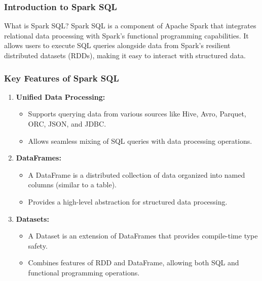 \documentclass[aspectratio=169]{beamer}
\begin{document}
\begin{frame}[fragile]
    \frametitle{Introduction to Spark SQL}
    \begin{block}{What is Spark SQL?}
        Spark SQL is a component of Apache Spark that integrates relational data processing with Spark's functional programming capabilities. It allows users to execute SQL queries alongside data from Spark’s resilient distributed datasets (RDDs), making it easy to interact with structured data.
    \end{block}
\end{frame}

\begin{frame}[fragile]
    \frametitle{Key Features of Spark SQL}
    \begin{enumerate}
        \item \textbf{Unified Data Processing:}
        \begin{itemize}
            \item Supports querying data from various sources like Hive, Avro, Parquet, ORC, JSON, and JDBC.
            \item Allows seamless mixing of SQL queries with data processing operations.
        \end{itemize}
        
        \item \textbf{DataFrames:}
        \begin{itemize}
            \item A DataFrame is a distributed collection of data organized into named columns (similar to a table).
            \item Provides a high-level abstraction for structured data processing.
        \end{itemize}
        
        \item \textbf{Datasets:}
        \begin{itemize}
            \item A Dataset is an extension of DataFrames that provides compile-time type safety.
            \item Combines features of RDD and DataFrame, allowing both SQL and functional programming operations.
        \end{itemize}
    \end{enumerate}
\end{frame}
\end{document}
